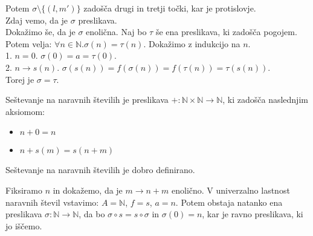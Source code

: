\begin{dokaz}
    Potem $\sigma \setminus \{(l, m')\}$ zadošča drugi in tretji točki, kar je protislovje. \\
    Zdaj vemo, da je $\sigma$ preslikava. \\
    Dokažimo še, da je $\sigma$ enolična.
    Naj bo $\tau$ še ena preslikava, ki zadošča pogojem.
    Potem velja: $\forall n \in \mathbb{N}. \sigma(n) = \tau(n)$.
    Dokažimo z indukcijo na $n$. \\
    1. $n = 0$.
    $\sigma(0) = a = \tau(0)$. \\
    2. $n \to s(n)$.
    $\sigma(s(n)) = f(\sigma(n)) = f(\tau(n)) = \tau(s(n))$. \\
    Torej je $\sigma = \tau$.
\end{dokaz}

\begin{definicija}
    Seštevanje na naravnih številih je preslikava $+: \mathbb{N} \times \mathbb{N} \to \mathbb{N}$, ki zadošča naslednjim aksiomom:
    \begin{itemize}
        \item $n + 0 = n$
        \item $n + s(m) = s(n + m)$
    \end{itemize}
\end{definicija}

\begin{trditev}
    Seštevanje na naravnih številih je dobro definirano.
\end{trditev}
\begin{dokaz}
    Fiksiramo $n$ in dokažemo, da je $m \to n + m$ enolično.
    V univerzalno lastnost naravnih števil vstavimo: $A = \mathbb{N}$, $f = s$, $a = n$.
    Potem obstaja natanko ena preslikava $\sigma: \mathbb{N} \to \mathbb{N}$, da bo $\sigma \circ s = s \circ \sigma$ in $\sigma(0) = n$,
    kar je ravno preslikava, ki jo iščemo.
\end{dokaz}

